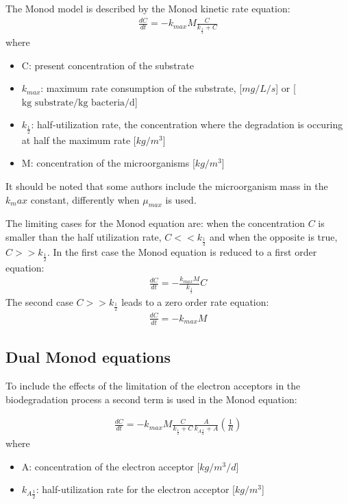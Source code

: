 \documentclass[12pt,twoside]{report}
\begin{document}
The Monod model is described by the Monod kinetic rate equation: 
\begin{align}
\frac{dC}{dt} = - k_{max} M \frac{C}{k_{\frac{1}{2}} + C}
\end{align}
where
\begin{itemize}
\item C: present concentration of the substrate
\item $k_{max}$: maximum rate consumption of the substrate, [$mg/L/s$] or [$\text{kg substrate/kg bacteria/d}$]
\item $k_{\frac{1}{2}}$: half-utilization rate, the concentration where the degradation is occuring at half the maximum rate [$kg/m^{3}$]
\item M: concentration of the microorganisms [$kg/m^3$]
\end{itemize}
It should be noted that some authors include the microorganism mass in the $k_max$ constant, differently when $\mu_{max}$ is used.  



The limiting cases for the Monod equation are: when the concentration $C$ is smaller than the half utilization rate, $C << k_{\frac{1}{2}}$ and when the opposite is true, $C >> k_{\frac{1}{2}}$. In the first case the Monod equation is reduced to a first order equation:
\begin{align}
\frac{dC}{dt} = - \frac{k_{max} M} {k_{\frac{1}{2}}}C
\end{align}
The second case $C >> k_{\frac{1}{2}}$ leads to a zero order rate equation:
\begin{align}
\frac{dC}{dt} = -k_{max} M
\end{align}

\subsection{Dual Monod equations}
To include the effects of the limitation of the electron acceptors in the biodegradation process a second term is used in the Monod equation:

\begin{align}
\frac{dC}{dt} = - k_{max} M \frac{C}{k_{\frac{1}{2}} + C}\frac{A}{k_{A\frac{1}{2}} + A}\left( \frac{1}{R}\right)
\end{align}
where 
\begin{itemize}
\item A: concentration of the electron acceptor [$kg/m^{3}/d$]
\item $k_{A\frac{1}{2}}$: half-utilization rate for the electron acceptor [$kg/m^3$]
\end{itemize}
\end{document}
